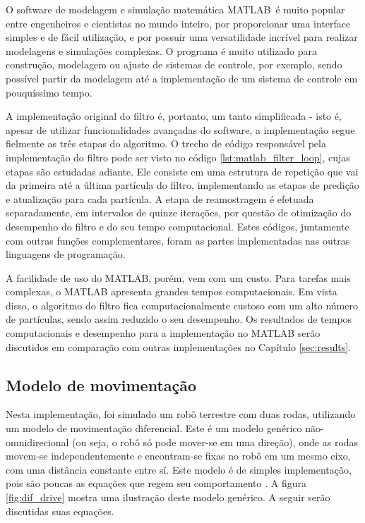 \documentclass[
	12pt,				%
	openright,			%
	oneside,			%
	a4paper,			%
	english,			%
	french,				%
	spanish,			%
	brazil,				%
	]{abntex2}
\begin{document}
O software de modelagem e simulação matemática MATLAB\texttrademark~é muito popular entre engenheiros e cientistas no mundo inteiro, por proporcionar uma interface simples e de fácil utilização, e por possuir uma versatilidade incrível para realizar modelagens e simulações complexas. O programa é muito utilizado para construção, modelagem ou ajuste de sistemas de controle, por exemplo, sendo possível partir da modelagem até a implementação de um sistema de controle em pouquíssimo tempo.\par
A implementação original do filtro é, portanto, um tanto simplificada - isto é, apesar de utilizar funcionalidades avançadas do software, a implementação segue fielmente as três etapas do algoritmo. O trecho de código responsável pela implementação do filtro pode ser visto no código \ref{lst:matlab_filter_loop}, cujas etapas são estudadas adiante. Ele consiste em uma estrutura de repetição que vai da primeira até a última partícula do filtro, implementando as etapas de predição e atualização para cada partícula. A etapa de reamostragem é efetuada separadamente, em intervalos de quinze iterações, por questão de otimização do desempenho do filtro e do seu tempo computacional. Estes códigos, juntamente com outras funções complementares, foram as partes implementadas nas outras linguagens de programação.\par
A facilidade de uso do MATLAB, porém, vem com um custo. Para tarefas mais complexas, o MATLAB apresenta grandes tempos computacionais. Em vista disso, o algoritmo do filtro fica computacionalmente custoso com um alto número de partículas, sendo assim reduzido o seu desempenho. Os resultados de tempos computacionais e desempenho para a implementação no MATLAB serão discutidos em comparação com outras implementações no Capítulo \ref{sec:results}.



\subsection{Modelo de movimentação}
\label{subsec:modelo_movimentação}
Nesta implementação, foi simulado um robô terrestre com duas rodas, utilizando um modelo de movimentação diferencial. Este é um modelo genérico não-omnidirecional (ou seja, o robô só pode mover-se em uma direção), onde as rodas movem-se independentemente e encontram-se fixas no robô em um mesmo eixo, com uma distância constante entre sí. Este modelo é de simples implementação, pois são poucas as equações que regem seu comportamento \cite{tcc_alex, SIE04}. A figura \ref{fig:dif_drive} mostra uma ilustração deste modelo genérico. A seguir serão discutidas suas equações.
\end{document}
